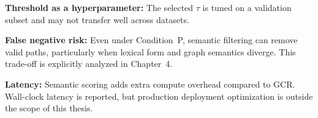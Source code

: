 \textbf{Threshold as a hyperparameter:} The selected $\tau$ is tuned on a validation subset and may not transfer well across datasets.

\textbf{False negative risk:} Even under Condition~P, semantic filtering can remove valid paths, particularly when lexical form and graph semantics diverge. This trade-off is explicitly analyzed in Chapter~4.

\textbf{Latency:} Semantic scoring adds extra compute overhead compared to GCR. Wall-clock latency is reported, but production deployment optimization is outside the scope of this thesis.